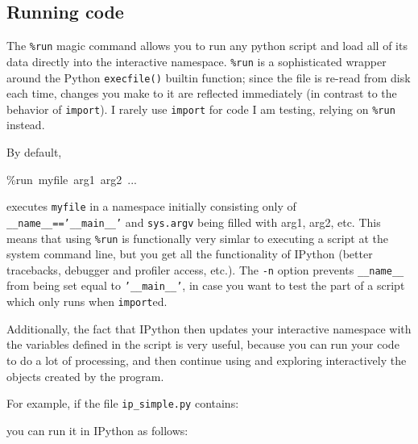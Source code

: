 \subsection{Running code}

The \texttt{\%run} magic command allows you to run any python script
and load all of its data directly into the interactive namespace.
\texttt{\%run} is a sophisticated wrapper around the Python \texttt{execfile()}
builtin function; since the file is re-read from disk each time, changes
you make to it are reflected immediately (in contrast to the behavior
of \texttt{import}). I rarely use \texttt{import} for code I am testing,
relying on \texttt{\%run} instead. 

By default, 

\begin{lyxcode}
\%run~myfile~arg1~arg2~...
\end{lyxcode}
executes \texttt{myfile} in a namespace initially consisting only
of \texttt{\_\_name\_\_=='\_\_main\_\_'} and \texttt{sys.argv} being
filled with arg1, arg2, etc. This means that using \texttt{\%run}
is functionally very simlar to executing a script at the system command
line, but you get all the functionality of IPython (better tracebacks,
debugger and profiler access, etc.). The \texttt{-n} option prevents
\texttt{\_\_name\_\_} from being set equal to \texttt{'\_\_main\_\_'},
in case you want to test the part of a script which only runs when
\texttt{import}ed. 

Additionally, the fact that IPython then updates your interactive
namespace with the variables defined in the script is very useful,
because you can run your code to do a lot of processing, and then
continue using and exploring interactively the objects created by
the program. 

For example, if the file \texttt{ip\_simple.py} contains:

you can run it in IPython
as follows:

